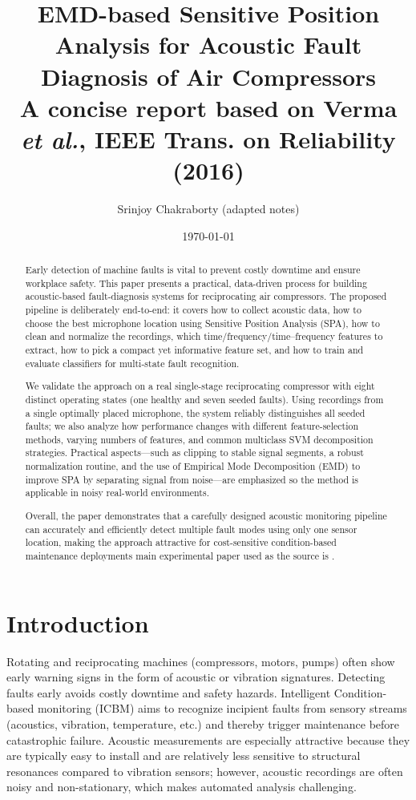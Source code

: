 \documentclass[12pt,a4paper]{article}
\title{EMD-based Sensitive Position Analysis for Acoustic Fault Diagnosis of Air Compressors\\
\vspace{6pt}
\large A concise report based on Verma \textit{et al.}, IEEE Trans. on Reliability (2016)}
\author{Srinjoy Chakraborty (adapted notes)}
\date{\today}
\begin{document}
\newpage




\tableofcontents
\newpage
\begin{abstract}
Early detection of machine faults is vital to prevent costly downtime and ensure workplace safety. This paper presents a practical, data-driven process for building acoustic-based fault-diagnosis systems for reciprocating air compressors. The proposed pipeline is deliberately end-to-end: it covers how to collect acoustic data, how to choose the best microphone location using Sensitive Position Analysis (SPA), how to clean and normalize the recordings, which time/frequency/time–frequency features to extract, how to pick a compact yet informative feature set, and how to train and evaluate classifiers for multi-state fault recognition.

We validate the approach on a real single-stage reciprocating compressor with eight distinct operating states (one healthy and seven seeded faults). Using recordings from a single optimally placed microphone, the system reliably distinguishes all seeded faults; we also analyze how performance changes with different feature-selection methods, varying numbers of features, and common multiclass SVM decomposition strategies. Practical aspects—such as clipping to stable signal segments, a robust normalization routine, and the use of Empirical Mode Decomposition (EMD) to improve SPA by separating signal from noise—are emphasized so the method is applicable in noisy real-world environments.

Overall, the paper demonstrates that a carefully designed acoustic monitoring pipeline can accurately and efficiently detect multiple fault modes using only one sensor location, making the approach attractive for cost-sensitive condition-based maintenance deployments main experimental paper used as the source is \cite{Verma2016}.
\end{abstract}
\section{Introduction}
Rotating and reciprocating machines (compressors, motors, pumps) often show early warning signs in the form of acoustic or vibration signatures. Detecting faults early avoids costly downtime and safety hazards. Intelligent Condition-based monitoring (ICBM) aims to recognize incipient faults from sensory streams (acoustics, vibration, temperature, etc.) and thereby trigger maintenance before catastrophic failure. Acoustic measurements are especially attractive because they are typically easy to install and are relatively less sensitive to structural resonances compared to vibration sensors; however, acoustic recordings are often noisy and non-stationary, which makes automated analysis challenging.
\end{document}
